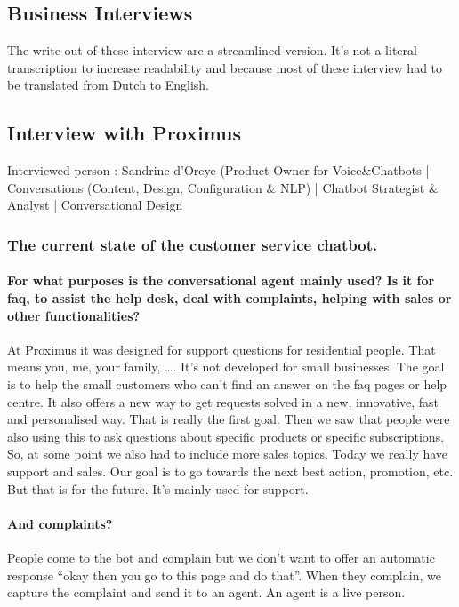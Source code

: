 \begin{appendices}
	\pagestyle{headings}
	\chapter{Business Interviews}
	\label{ch:appendices}
	The write-out of these interview are a streamlined version. It's not a literal transcription to increase readability and because most of these interview had to be translated from Dutch to English.
	
	\section{Interview with Proximus}
	\label{in:Proximus}
	Interviewed person : Sandrine d'Oreye (Product Owner for Voice\&Chatbots | Conversations (Content, Design, Configuration \& NLP) | Chatbot Strategist \& Analyst | Conversational Design
	\subsection{The current state of the customer service chatbot.}
	\subsubsection{For what purposes is the conversational agent mainly used? Is it for \acrshort{faq}, to assist the help desk, deal with complaints, helping with sales or other functionalities?}
	At Proximus it was designed for support questions for residential people. That means you, me, your family, …. It’s not developed for small businesses. The goal is to help the small customers who can’t find an answer on the \acrshort{faq} pages or help centre. It also offers a new way to get requests solved in a new, innovative, fast and personalised way. That is really the first goal. Then we saw that people were also using this to ask questions about specific products or specific subscriptions. So, at some point we also had to include more sales topics. Today we really have support and sales. Our goal is to go towards the next best action, promotion, etc. But that is for the future. It’s mainly used for support.
	
	\subsubsection{And complaints?}
	People come to the bot and complain but we don’t want to offer an automatic response “okay then you go to this page and do that”. When they complain, we capture the complaint and send it to an agent. An agent is a live person.
	

\end{appendices}
